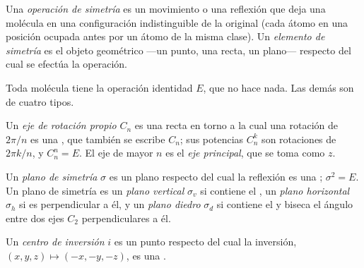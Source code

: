 \begin{definition}\label{def:b3:point-groups:operation}
Una \emph{operación de simetría} es un movimiento o una
reflexión que deja una molécula en una configuración indistinguible de
la original (cada átomo en una posición ocupada antes por un átomo de la misma
clase). Un \emph{elemento de simetría} es el objeto
geométrico ---un punto, una recta, un plano--- respecto del cual se efectúa
la operación.
\end{definition}

Toda molécula tiene la operación identidad $E$, que no hace nada. Las
demás son de cuatro tipos.

\begin{definition}\label{def:b3:point-groups:rotation}
Un \emph{eje de rotación propio} $C_n$ es una recta
en torno a la cual una rotación de $2\pi/n$ es una , que también se escribe
$C_n$; sus potencias $C_n^k$ son rotaciones de $2\pi k/n$, y $C_n^n = E$. El
eje de mayor $n$ es el \emph{eje principal}, que se toma
como $z$.
\end{definition}

\begin{definition}\label{def:b3:point-groups:mirror}
Un \emph{plano de simetría} $\sigma$ es un plano respecto del cual
la reflexión es una ; $\sigma^2 = E$. Un plano de simetría es un
\emph{plano vertical} $\sigma_v$ si
contiene el , un \emph{plano
horizontal} $\sigma_h$ si es perpendicular a
él, y un \emph{plano diedro}
$\sigma_d$ si contiene el  y biseca el ángulo entre
dos ejes $C_2$ perpendiculares a él.
\end{definition}

\begin{definition}\label{def:b3:point-groups:inversion}
Un \emph{centro de inversión} $i$ es un punto
respecto del cual la inversión, $(x, y, z) \mapsto (-x, -y, -z)$, es una .
\end{definition}

